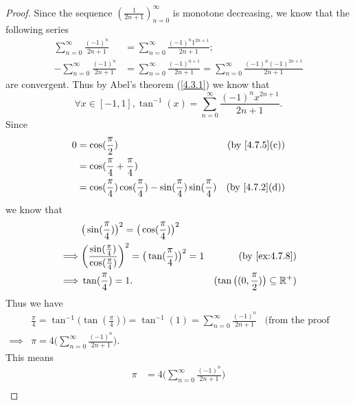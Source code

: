\begin{proof}
  Since the sequence \((\frac{1}{2n + 1})_{n = 0}^\infty\) is monotone decreasing, we know that the following series
  \begin{align*}
    \sum_{n = 0}^\infty \frac{(-1)^n}{2n + 1}  & = \sum_{n = 0}^\infty \frac{(-1)^n 1^{2n + 1}}{2n + 1};                                                     \\
    -\sum_{n = 0}^\infty \frac{(-1)^n}{2n + 1} & = \sum_{n = 0}^\infty \frac{(-1)^{n + 1}}{2n + 1} = \sum_{n = 0}^\infty \frac{(-1)^n (-1)^{2n + 1}}{2n + 1}
  \end{align*}
  are convergent.
  Thus by Abel's theorem (\cref{4.3.1}) we know that
  \[
    \forall x \in [-1, 1], \tan^{-1}(x) = \sum_{n = 0}^\infty \frac{(-1)^n x^{2n + 1}}{2n + 1}.
  \]
  Since
  \begin{align*}
    0 & = \cos(\frac{\pi}{2})                                                               & \text{(by \cref{4.7.5}(c))} \\
      & = \cos(\frac{\pi}{4} + \frac{\pi}{4})                                                                             \\
      & = \cos(\frac{\pi}{4}) \cos(\frac{\pi}{4}) - \sin(\frac{\pi}{4}) \sin(\frac{\pi}{4}) & \text{(by \cref{4.7.2}(d))}
  \end{align*}
  we know that
  \begin{align*}
             & \big(\sin(\frac{\pi}{4})\big)^2 = \big(\cos(\frac{\pi}{4})\big)^2                                                                                       \\
    \implies & \bigg(\frac{\sin(\frac{\pi}{4})}{\cos(\frac{\pi}{4})}\bigg)^2 = \big(\tan(\frac{\pi}{4})\big)^2 = 1 & \text{(by \cref{ex:4.7.8})}                       \\
    \implies & \tan(\frac{\pi}{4}) = 1.                                                                            & (\tan\big((0, \frac{\pi}{2})\big) \subseteq \R^+)
  \end{align*}
  Thus we have
  \begin{align*}
             & \frac{\pi}{4} = \tan^{-1}\big(\tan(\frac{\pi}{4})\big) = \tan^{-1}(1) = \sum_{n = 0}^\infty \frac{(-1)^n}{2n + 1} & \text{(from the proof above)} \\
    \implies & \pi = 4 \bigg(\sum_{n = 0}^\infty \frac{(-1)^n}{2n + 1}\bigg).
  \end{align*}
  This means
  \begin{align*}
    \pi & = 4 \bigg(\sum_{n = 0}^\infty \frac{(-1)^n}{2n + 1}\bigg)                                                                             \\

\end{align*}
\end{proof}
